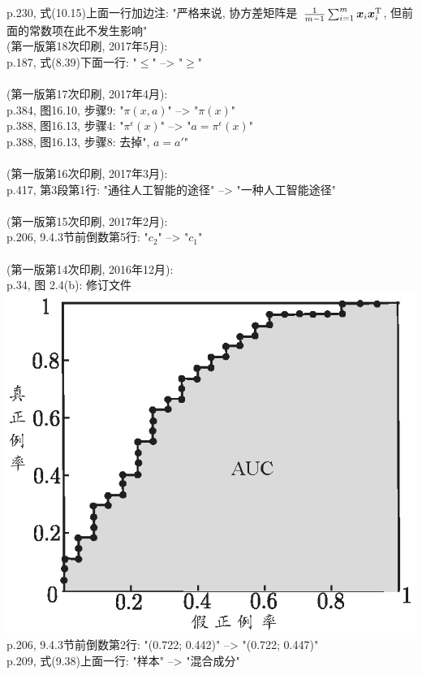 \documentclass[UTF8]{article}
\begin{document}
p.230, 式(10.15)上面一行加边注: "严格来说, 协方差矩阵是~${1 \over {m-1}}\sum\nolimits_{i=1}^m\bm{x}_i\bm{x}_i^{\rm T}$, 但前面的常数项在此不发生影响"
\\
(第一版第18次印刷, 2017年5月):
\\
p.187, 式(8.39)下面一行: "$\le$" --> "$\ge$" \\
\\
(第一版第17次印刷, 2017年4月):
\\
p.384, 图16.10, 步骤9: "$\pi(x, a)$" --> "$\pi(x)$" \\
p.388, 图16.13, 步骤4: "$\pi^{\epsilon}(x)$" --> "$a = \pi^{\epsilon}(x)$" \\
p.388, 图16.13, 步骤8: 去掉", $a = a'$" \\
\\
(第一版第16次印刷, 2017年3月):
\\
p.417, 第3段第1行: "通往人工智能的途径" --> "一种人工智能途径" \\
\\
(第一版第15次印刷, 2017年2月):
\\
p.206, 9.4.3节前倒数第5行: "$c_2$" --> "$c_1$" \\
\\
(第一版第14次印刷, 2016年12月):
\\
p.34, 图 2.4(b): 修订文件\\
\includegraphics{pic/mlbookfig24b.eps} \\
p.206, 9.4.3节前倒数第2行: "(0.722; 0.442)" --> "(0.722; 0.447)" \\
p.209, 式(9.38)上面一行: "样本" --> "混合成分" \\
\end{document}
